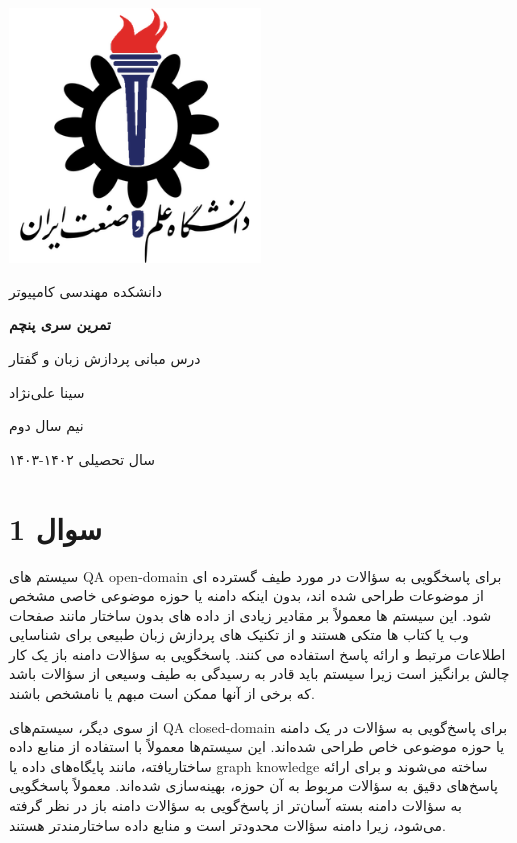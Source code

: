 \documentclass{article}
\begin{document}
\begin{titlepage}
  \centering
  \includegraphics[width=0.5\textwidth]{iust}\par\vspace{1cm}
  {\scshape\LARGE دانشکده مهندسی کامپیوتر \par}
  \vspace{1cm}
  {\huge\bfseries تمرین سری پنچم \par}
  \vspace{1cm}
  {\Large درس مبانی پردازش زبان و گفتار \par}
  \vspace{1cm}
  {\large سینا علی‌نژاد \par}
  \vspace{5cm}
  {\large نیم سال دوم \par}
  {\large سال تحصیلی ۱۴۰۲-۱۴۰۳ \par}
\end{titlepage}
\newpage
\doublespacing
\section*{سوال 1}
سیستم های QA open-domain برای پاسخگویی به سؤالات در مورد طیف گسترده ای از موضوعات طراحی شده اند، بدون اینکه دامنه یا حوزه موضوعی خاصی مشخص شود. این سیستم ها معمولاً بر مقادیر زیادی از داده های بدون ساختار مانند صفحات وب یا کتاب ها متکی هستند و از تکنیک های پردازش زبان طبیعی برای شناسایی اطلاعات مرتبط و ارائه پاسخ استفاده می کنند. پاسخگویی به سؤالات دامنه باز یک کار چالش برانگیز است زیرا سیستم باید قادر به رسیدگی به طیف وسیعی از سؤالات باشد که برخی از آنها ممکن است مبهم یا نامشخص باشند.

از سوی دیگر، سیستم‌های QA closed-domain برای پاسخ‌گویی به سؤالات در یک دامنه یا حوزه موضوعی خاص طراحی شده‌اند. این سیستم‌ها معمولاً با استفاده از منابع داده ساختاریافته، مانند پایگاه‌های داده یا graph knowledge ساخته می‌شوند و برای ارائه پاسخ‌های دقیق به سؤالات مربوط به آن حوزه، بهینه‌سازی شده‌اند. معمولاً پاسخگویی به سؤالات دامنه بسته آسان‌تر از پاسخ‌گویی به سؤالات دامنه باز در نظر گرفته می‌شود، زیرا دامنه سؤالات محدودتر است و منابع داده ساختارمندتر هستند.
\end{document}
